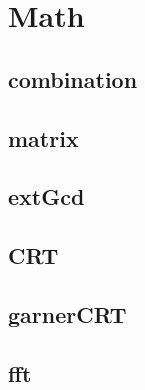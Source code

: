 \section{Math}

\subsection{combination}


\subsection{matrix}


\subsection{extGcd}


\subsection{CRT}


\subsection{garnerCRT}


\subsection{fft}

